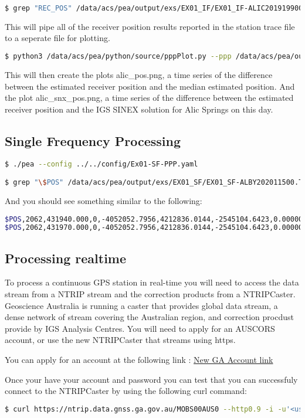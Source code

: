 \begin{lstlisting}[language=bash]
$ grep "REC_POS" /data/acs/pea/output/exs/EX01_IF/EX01_IF-ALIC201919900.TRACE > ALIC_201919900.PPP
\end{lstlisting}
This will pipe all of the receiver position results reported in the station trace file to a seperate file for plotting.
\begin{lstlisting}[language=bash]
$ python3 /data/acs/pea/python/source/pppPlot.py --ppp /data/acs/pea/output/exs/EX01_IF/ALIC_201919900.PPP
\end{lstlisting}
This will then create the plots alic\_pos.png, a time series of the difference between the estimated receiver position and the median estimated position.
And the plot alic\_snx\_pos.png, a time series of the difference between the estimated receiver position and the IGS SINEX solution for Alic Springs on this day.

\subsection{Single Frequency Processing} 
\begin{lstlisting}[language=bash]
$ ./pea --config ../../config/Ex01-SF-PPP.yaml

$ grep "\$POS" /data/acs/pea/output/exs/EX01_SF/EX01_SF-ALBY202011500.TRACE
\end{lstlisting}
And you should see something similar to the following:
\begin{lstlisting}[language=bash]
$POS,2062,431940.000,0,-4052052.7956,4212836.0144,-2545104.6423,0.00000043966020,...
$POS,2062,431970.000,0,-4052052.7956,4212836.0144,-2545104.6423,0.00000043965772,...
\end{lstlisting}



\subsection{Processing realtime}
To process a continuous GPS station in real-time you will need to access the data stream from a NTRIP stream and the correction products from a NTRIPCaster.
Geoscience Australia is running a caster that provides global data stream, a dense network of stream covering the Australian region, and correction procdust provide by IGS Analysis Centres.
You will need to apply for an AUSCORS account, or use the new NTRIPCaster that streams using https.

You can apply for an account at the following link : \href{https://gnss-users-prod.auth.ap-southeast-2.amazoncognito.com/login?response_type=code&client_id=11njl767q0tl1faf9qna469vl1&redirect_uri=https://search-gnss-elasticsearch-prod-5omhch5quzlu5dcpbct4ev5qz4.ap-southeast-2.es.amazonaws.com/_plugin/kibana/app/kibana&state=e36b2054-7ace-4931-91a3-5ba6de893917}{New GA Account link}

Once your have your account and password you can test that you can successfuly connect to the NTRIPCaster by using the following curl command:
\begin{lstlisting}[language=bash]
$ curl https://ntrip.data.gnss.ga.gov.au/MOBS00AUS0 --http0.9 -i -u'<username>:<password> --output -'
\end{lstlisting}

